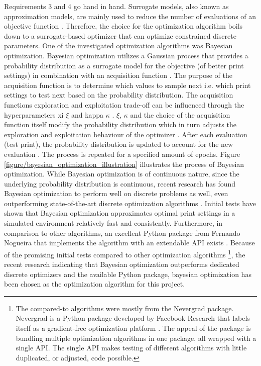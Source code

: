Requirements 3 and 4 go hand in hand. Surrogate models, also known as approximation models, are mainly used to reduce the number of evaluations of an objective function \cite{molnar2019}. Therefore, the choice for the optimization algorithm boils down to a surrogate-based optimizer that can optimize constrained discrete parameters. One of the investigated optimization algorithms was Bayesian optimization. Bayesian optimization utilizes a Gaussian process that provides a probability distribution as a surrogate model for the objective (of better print settings) in combination with an acquisition function \cite{frazier2018tutorial}. The purpose of the acquisition function is to determine which values to sample next i.e. which print settings to test next based on the probability distribution. The acquisition functions exploration and exploitation trade-off can be influenced through the hyperparameters xi $\xi$ and kappa $\kappa$ \cite{agnihotri2020exploring, bayesianPythonPackage}. $\xi$, $\kappa$ and the choice of the acquisition function itself modify the probability distribution which in turn adjusts the exploration and exploitation behaviour of the optimizer \cite{agnihotri2020exploring}. After each evaluation (test print), the probability distribution is updated to account for the new evaluation \cite{frazier2018tutorial, agnihotri2020exploring}. The process is repeated for a specified amount of epochs. Figure \ref{figure/bayesian_optimization_illustration} illustrates the process of Bayesian optimization. While Bayesian optimization is of continuous nature, since the underlying probability distribution is continuous, recent research has found Bayesian optimization to perform well on discrete problems as well, even outperforming state-of-the-art discrete optimization algorithms \cite{karlsson2020continuous}. Initial tests have shown that Bayesian optimization approximates optimal print settings in a simulated environment relatively fast and consistently. Furthermore, in comparison to other algorithms, an excellent Python package from Fernando Nogueira that implements the algorithm with an extendable API exists \cite{bayesianPythonPackage}. Because of the promising initial tests compared to other optimization algorithms \footnote{The compared-to algorithms were mostly from the Nevergrad package. Nevergrad is a Python package developed by Facebook Research that labels itself as a gradient-free optimization platform \cite{nevergrad}. The appeal of the package is bundling multiple optimization algorithms in one package, all wrapped with a single API. The single API makes testing of different algorithms with little duplicated, or adjusted, code possible.}, the recent research indicating that Bayesian optimization outperforms dedicated discrete optimizers and the available Python package, bayesian optimization has been chosen as the optimization algorithm for this project. 


